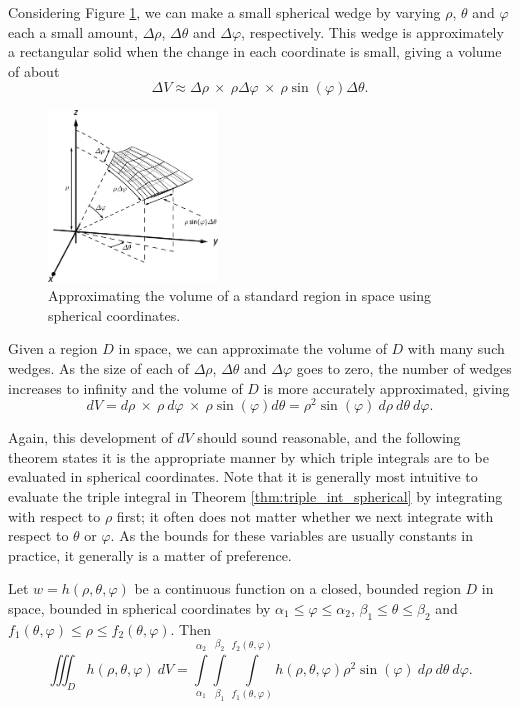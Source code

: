 Considering Figure \ref{fig_multiple_33}, we can make a small spherical wedge by varying $\rho$, $\theta$ and $\varphi$ each a small amount, $\Delta\rho$, $\Delta\theta$ and $\Delta\varphi$, respectively. This wedge is approximately a rectangular solid when the change in each coordinate is small, giving a volume of about
$$\Delta V \approx \Delta\rho\ \times\ \rho\Delta\varphi\ \times\ \rho\sin(\varphi)\Delta\theta.$$

\begin{figure}
	\begin{center}
			\includegraphics[width=0.4\textwidth]{fig_multiple_33}
	\caption{Approximating the volume of a standard region in space using spherical coordinates.}
	\label{fig_multiple_33}
	\end{center}
\end{figure}


Given a region $D$ in space, we can approximate the volume of $D$ with many such wedges. As the size of each of $\Delta\rho$, $\Delta\theta$ and $\Delta\varphi$ goes to zero, the number of wedges increases to infinity and the volume of $D$ is more accurately approximated, giving
$$dV = d\rho\ \times\ \rho\ d\varphi\ \times\ \rho\sin(\varphi)d\theta = \rho^2\sin(\varphi)\ d\rho\ d\theta\ d\varphi.$$

Again, this development of $dV$ should sound reasonable, and the following theorem states it is the appropriate manner by which triple integrals are to be evaluated in spherical coordinates.
Note that it is generally most intuitive to evaluate the triple integral in Theorem \ref{thm:triple_int_spherical} by integrating with respect to $\rho$ first; it often does not matter whether we next integrate with respect to $\theta$ or $\varphi$. As the bounds for these variables are usually constants in practice, it generally is a matter of preference.

\pagebreak
\begin{theorem}
\label{thm:triple_int_spherical}
Let $w=h(\rho,\theta,\varphi)$ be a continuous function on a closed, bounded region $D$ in space, bounded in spherical coordinates by $\alpha_1 \leq \varphi \leq \alpha_2$, $\beta_1 \leq \theta \leq \beta_2$ and $f_1(\theta,\varphi) \leq \rho \leq f_2(\theta,\varphi)$. Then 
$$\iiint_D h(\rho,\theta,\varphi)\ dV = \int\limits_{\alpha_1}^{\alpha_2}\int\limits_{\beta_1}^{\beta_2}\int\limits_{f_1(\theta,\varphi)}^{f_2(\theta,\varphi)} h(\rho,\theta,\varphi) \rho^2\sin(\varphi)\ d\rho\ d\theta\ d\varphi.$$
\end{theorem}


